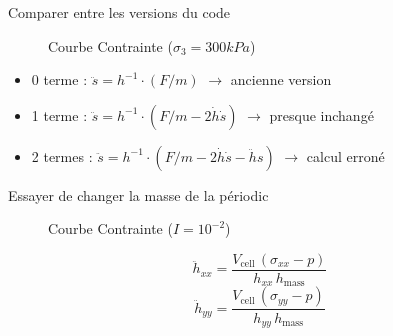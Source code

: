 \documentclass[10pt]{beamer}
\begin{document}
\begin{frame}{Comparer entre les versions du code}
    \begin{figure}[h]
        \centering
        \scalebox{0.5}{}
        \caption{Courbe Contrainte ($\sigma_3 = 300kPa$)}
    \end{figure}
    \begin{itemize}
        \item 0 terme : $\ddot{s} = h^{-1} \cdot (F/m)$ $\rightarrow$ ancienne version
        \item 1 terme : $\ddot{s} = h^{-1} \cdot (F/m - 2 \dot{h} \dot{s})$ $\rightarrow$ presque inchangé
        \item 2 termes : $\ddot{s} = h^{-1} \cdot (F/m - 2 \dot{h} \dot{s} - \ddot{h} s)$ $\rightarrow$ calcul erroné
    \end{itemize}
\end{frame}

\begin{frame}{Essayer de changer la masse de la périodic}
    \begin{figure}[h]
        \centering
        \scalebox{0.5}{}
        \caption{Courbe Contrainte ($I = 10^{-2}$)}
    \end{figure}
    \[
        \ddot{h}_{xx} = \frac{V_{\text{cell}} \, (\sigma_{xx} - p)}{h_{xx} \, h_{\text{mass}}}
    \]
    \[
        \ddot{h}_{yy} = \frac{V_{\text{cell}} \, (\sigma_{yy} - p)}{h_{yy} \, h_{\text{mass}}}
    \]

\end{frame}
\end{document}
